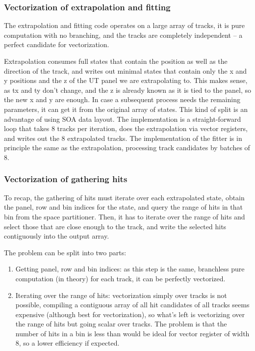 \documentclass[12pt]{article}
\begin{document}
\subsubsection{Vectorization of extrapolation and fitting}\label{sec_velout_vectorize_extrap_fit}

The extrapolation and fitting code operates on a large array of tracks, it is pure computation with no branching, and the tracks are completely independent -- a perfect candidate for vectorization.

Extrapolation consumes full states that contain the position as well as the direction of the track, and writes out minimal states that contain only the x and y positions and the z of the UT panel we are extrapolating to. This makes sense, as tx and ty don't change, and the z is already known as it is tied to the panel, so the new x and y are enough. In case a subsequent process needs the remaining parameters, it can get it from the original array of states. This kind of split is an advantage of using SOA data layout. The implementation is a straight-forward loop that takes 8 tracks per iteration, does the extrapolation via vector registers, and writes out the 8 extrapolated tracks. The implementation of the fitter is in principle the same as the extrapolation, processing track candidates by batches of 8.


\subsubsection{Vectorization of gathering hits}\label{sec_velout_vectorize_gathering_hits}

To recap, the gathering of hits must iterate over each extrapolated state, obtain the panel, row and bin indices for the state, and query the range of hits in that bin from the space partitioner. Then, it has to iterate over the range of hits and select those that are close enough to the track, and write the selected hits contiguously into the output array.

The problem can be split into two parts:
\begin{enumerate}
	\item Getting panel, row and bin indices: as this step is the same, branchless pure computation (in theory) for each track, it can be perfectly vectorized.
	\item Iterating over the range of hits: vectorization simply over tracks is not possible, compiling a contiguous array of all hit candidates of all tracks seems expensive (although best for vectorization), so what's left is vectorizing over the range of hits but going scalar over tracks. The problem is that the number of hits in a bin is less than would be ideal for vector register of width 8, so a lower efficiency if expected.
\end{enumerate}
\end{document}
